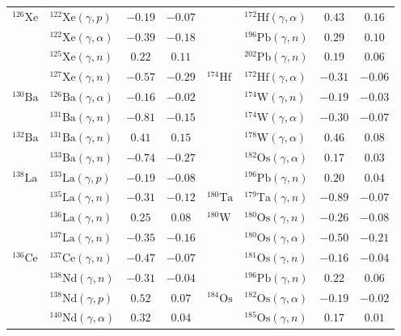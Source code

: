 \begin{table}
\begin{tabular}{llcc|llcc}
    $^{126}\mathrm{Xe}$ & $^{122}\mathrm{Xe}(\gamma,p)$ & $-0.19$ & $-0.07$ & $ $ & $^{172}\mathrm{Hf}(\gamma,\alpha)$ & $0.43$ & $0.16$ \\ 
    $ $ & $^{122}\mathrm{Xe}(\gamma,\alpha)$ & $-0.39$ & $-0.18$ & $ $ & $^{196}\mathrm{Pb}(\gamma,n)$ & $0.29$ & $0.10$ \\ 
    $ $ & $^{125}\mathrm{Xe}(\gamma,n)$ & $0.22$ & $0.11$ & $ $ & $^{202}\mathrm{Pb}(\gamma,n)$ & $0.19$ & $0.06$ \\ 
    $ $ & $^{127}\mathrm{Xe}(\gamma,n)$ & $-0.57$ & $-0.29$ & $^{174}\mathrm{Hf}$ & $^{172}\mathrm{Hf}(\gamma,\alpha)$ & $-0.31$ & $-0.06$ \\ 
    $^{130}\mathrm{Ba}$ & $^{126}\mathrm{Ba}(\gamma,\alpha)$ & $-0.16$ & $-0.02$ & $ $ & $^{174}\mathrm{W}(\gamma,n)$ & $-0.19$ & $-0.03$ \\ 
    $ $ & $^{131}\mathrm{Ba}(\gamma,n)$ & $-0.81$ & $-0.15$ & $ $ & $^{174}\mathrm{W}(\gamma,\alpha)$ & $-0.30$ & $-0.07$ \\ 
    $^{132}\mathrm{Ba}$ & $^{131}\mathrm{Ba}(\gamma,n)$ & $0.41$ & $0.15$ & $ $ & $^{178}\mathrm{W}(\gamma,\alpha)$ & $0.46$ & $0.08$ \\ 
    $ $ & $^{133}\mathrm{Ba}(\gamma,n)$ & $-0.74$ & $-0.27$ & $ $ & $^{182}\mathrm{Os}(\gamma,\alpha)$ & $0.17$ & $0.03$ \\ 
    $^{138}\mathrm{La}$ & $^{133}\mathrm{La}(\gamma,p)$ & $-0.19$ & $-0.08$ & $ $ & $^{196}\mathrm{Pb}(\gamma,n)$ & $0.20$ & $0.04$ \\ 
    $ $ & $^{135}\mathrm{La}(\gamma,n)$ & $-0.31$ & $-0.12$ & $^{180}\mathrm{Ta}$ & $^{179}\mathrm{Ta}(\gamma,n)$ & $-0.89$ & $-0.07$ \\ 
    $ $ & $^{136}\mathrm{La}(\gamma,n)$ & $0.25$ & $0.08$ & $^{180}\mathrm{W}$ & $^{180}\mathrm{Os}(\gamma,n)$ & $-0.26$ & $-0.08$ \\ 
    $ $ & $^{137}\mathrm{La}(\gamma,n)$ & $-0.35$ & $-0.16$ & $ $ & $^{180}\mathrm{Os}(\gamma,\alpha)$ & $-0.50$ & $-0.21$ \\ 
    $^{136}\mathrm{Ce}$ & $^{137}\mathrm{Ce}(\gamma,n)$ & $-0.47$ & $-0.07$ & $ $ & $^{181}\mathrm{Os}(\gamma,n)$ & $-0.16$ & $-0.04$ \\ 
    $ $ & $^{138}\mathrm{Nd}(\gamma,n)$ & $-0.31$ & $-0.04$ & $ $ & $^{196}\mathrm{Pb}(\gamma,n)$ & $0.22$ & $0.06$ \\ 
    $ $ & $^{138}\mathrm{Nd}(\gamma,p)$ & $0.52$ & $0.07$ & $^{184}\mathrm{Os}$ & $^{182}\mathrm{Os}(\gamma,\alpha)$ & $-0.19$ & $-0.02$ \\ 
    $ $ & $^{140}\mathrm{Nd}(\gamma,\alpha)$ & $0.32$ & $0.04$ & $ $ & $^{185}\mathrm{Os}(\gamma,n)$ & $0.17$ & $0.01$ \\ 

\end{tabular}
\end{table}
